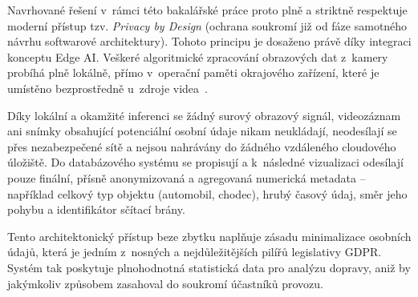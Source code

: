 Navrhované řešení v~rámci této bakalářské práce proto plně a striktně respektuje moderní přístup tzv. \textit{Privacy by Design} (ochrana soukromí již od fáze samotného návrhu softwarové architektury). Tohoto principu je dosaženo právě díky integraci konceptu Edge AI. Veškeré algoritmické zpracování obrazových dat z~kamery probíhá plně lokálně, přímo v~operační paměti okrajového zařízení, které je umístěno bezprostředně u~zdroje videa~\cite{li_edge_ai_2020}. 

Díky lokální a okamžité inferenci se žádný surový obrazový signál, videozáznam ani snímky obsahující potenciální osobní údaje nikam neukládají, neodesílají se přes nezabezpečené sítě a nejsou nahrávány do žádného vzdáleného cloudového úložiště. Do databázového systému se propisují a k~následné vizualizaci odesílají pouze finální, přísně anonymizovaná a agregovaná numerická metadata – například celkový typ objektu (automobil, chodec), hrubý časový údaj, směr jeho pohybu a identifikátor sčítací brány. 

Tento architektonický přístup beze zbytku naplňuje zásadu minimalizace osobních údajů, která je jedním z~nosných a nejdůležitějších pilířů legislativy GDPR. Systém tak poskytuje plnohodnotná statistická data pro analýzu dopravy, aniž by jakýmkoliv způsobem zasahoval do soukromí účastníků provozu.

